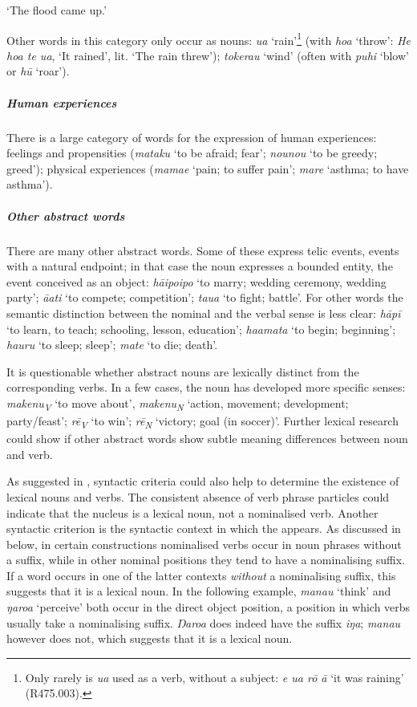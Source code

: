 \glt
‘The flood came up.’ \textstyleExampleref{[Mtx-7-17.012]}
\z

Other words in this category only occur as nouns: \textit{{\ꞌ}ua} ‘rain’\footnote{\label{fn:101}Only rarely is \textit{{\ꞌ}ua} used as a verb, without a subject: \textit{e {\ꞌ}ua rō {\ꞌ}ā} ‘it was raining’ (R475.003).} (with \textit{hoa} ‘throw’: \textit{He hoa te {\ꞌ}ua}, ‘It rained’, lit. ‘The rain threw’); \textit{tokerau} ‘wind’ (often with \textit{puhi} ‘blow’ or \textit{hū} ‘roar’).

{\sloppy
\subparagraph{Human experiences} There is a large category of words for the expression of \mbox{human} experiences: feelings and propensities (\textit{mataku} ‘to be afraid; fear’; \textit{nounou} ‘to be greedy; greed’); physical experiences (\textit{mamae} ‘pain; to suffer pain’; \textit{mare} ‘asthma; to have asth\-ma’).
}

\subparagraph{Other abstract words} There are many other abstract words. Some of these express telic events, events with a natural endpoint; in that case the noun expresses a bounded entity, the event conceived as an object: \textit{hāipoipo} ‘to marry; wedding ceremony, wedding party’; \textit{{\ꞌ}ā{\ꞌ}ati} ‘to compete; competition’; \textit{tau{\ꞌ}a} ‘to fight; battle’. For other words the semantic distinction between the nominal and the verbal sense is less clear: \textit{hāpī} ‘to learn, to teach; schooling, lesson, education’; \textit{ha{\ꞌ}amata} ‘to begin; beginning’; \textit{ha{\ꞌ}uru} ‘to sleep; sleep’; \textit{mate} ‘to die; death’. 

It is questionable whether abstract nouns are lexically distinct from the corresponding verbs. In a few cases, the noun has developed more specific senses: \textit{makenu}\textit{\textsubscript{V}} ‘to move about’, \textit{makenu}\textit{\textsubscript{N}} ‘action, movement; development; party/feast’; \textit{rē}\textit{\textsubscript{V}} ‘to win’; \textit{rē}\textit{\textsubscript{N}} ‘victory; goal (in soccer)’. Further lexical research could show if other abstract words show subtle meaning differences between noun and verb. 

As suggested in , syntactic criteria could also help to determine the existence of lexical nouns and verbs. The consistent absence of verb phrase particles could indicate that the nucleus is a lexical noun, not a nominalised verb. Another syntactic criterion is the syntactic context in which the  appears. As discussed in  below, in certain constructions nominalised verbs occur in noun phrases without a suffix, while in other nominal positions they tend to have a nominalising suffix. If a word occurs in one of the latter contexts \textit{without} a nominalising suffix, this suggests that it is a lexical noun. In the following example, \textit{mana{\ꞌ}u} ‘think’ and \textit{ŋaro{\ꞌ}a} ‘perceive’ both occur in the direct object position, a position in which verbs usually take a nominalising suffix. \textit{\mbox{Ŋaro{\ꞌ}a}} does indeed have the suffix \textit{iŋa}; \textit{mana{\ꞌ}u} however does not, which suggests that it is a lexical noun.

